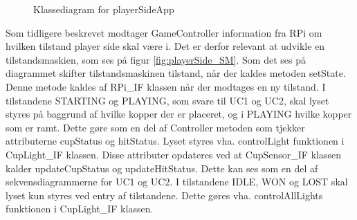 \documentclass[Rapport/Rapport_main.tex]{subfiles}
\begin{document}
\begin{figure}[H]
    \centering
    \centering
    \caption{Klassediagram for playerSideApp}
    \label{fig:CD_PlayerSide}
\end{figure}

Som tidligere beskrevet modtager GameController information fra RPi om hvilken tilstand player side skal være i. Det er derfor relevant at udvikle en tilstandsmaskien, som ses på figur \ref{fig:playerSide_SM}. Som det ses på diagrammet skifter tilstandsmaskinen tilstand, når der kaldes metoden setState. Denne metode kaldes af RPi\_IF klassen når der modtages en ny tilstand. I tilstandene STARTING og PLAYING, som svare til UC1 og UC2, skal lyset styres på baggrund af hvilke kopper der er placeret, og i PLAYING hvilke kopper som er ramt. Dette gøre som en del af Controller metoden som tjekker attributerne cupStatus og hitStatus. Lyset styres vha. controlLight funktionen i CupLight\_IF klassen. Disse attributer opdateres ved at CupSensor\_IF klassen kalder updateCupStatus og updateHitStatus. Dette kan ses som en del af sekvensdiagrammerne for UC1 og UC2. I tilstandene IDLE, WON og LOST skal lyset kun styres ved entry af tilstandene. Dette gøres vha. controlAllLights funktionen i CupLight\_IF klassen.      
\end{document}
